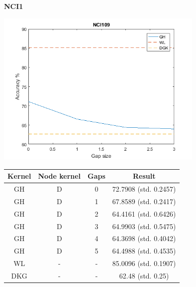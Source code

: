 \documentclass{article}
\begin{document}
\textbf{NCI1}\\
\begin{minipage}{0.6\linewidth}
	\hspace*{-1in}
	\includegraphics[width=10cm]{nci1}
	\label{fig:nci1}
\end{minipage}
\begin{minipage}[c]{0.5\linewidth}
	
	\centering
	\begin{tabular}{c|c|c|c}
		Kernel & Node kernel & Gaps & Result\\
		\hline
		GH & D & 0 & 72.7908 (std. 0.2457)\\
		GH & D & 1 & 67.8589 (std. 0.2417)\\
		GH & D & 2 & 64.4161 (std. 0.6426)\\
		GH & D & 3 & 64.9903 (std. 0.5475)\\
		GH & D & 4 & 64.3698 (std. 0.4042)\\
		GH & D & 5 & 64.4988 (std. 0.4535)\\
		WL & - & - & 85.0096 (std. 0.1907)\\
		DKG & - & - & 62.48 (std. 0.25)
	\end{tabular}
	\label{table:nci1}
\end{minipage}
\end{document}
